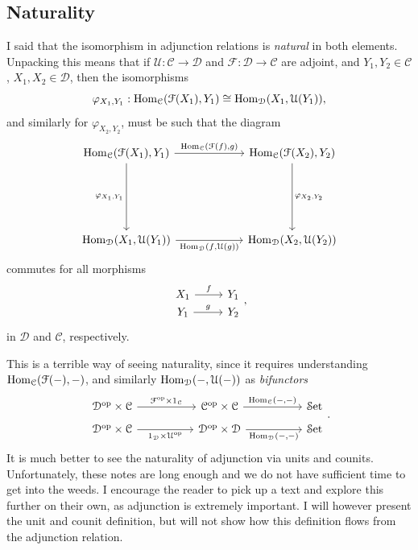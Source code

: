 \subsection{Naturality}

I said that the isomorphism in adjunction relations is \emph{natural} in both elements. Unpacking this means that if $\mathcal{U} : \mathcal{C}  \to \mathcal{D} $ and $\mathcal{F} : \mathcal{D}  \to \mathcal{C} $ are adjoint, and $Y_1,Y_2\in \mathcal{C} $, $X_1,X_2\in \mathcal{D} $, then the isomorphisms
\[
	\varphi_{X_1,Y_1} : \operatorname{Hom}_{\mathcal{C} }(\mathcal{F} (X_1), Y_1) \cong \operatorname{Hom}_{\mathcal{D} }(X_1, \mathcal{U} (Y_1)) 
,\]
and similarly  for $\varphi_{X_2,Y_2} $, must be such that the diagram
\[\begin{tikzcd}[row sep = 6em, column sep = 6em]
\Hom_{\mathcal{C} }(\mathcal{F} (X_1), Y_1) \ar[" \Hom_{\mathcal{C} }(\mathcal{F} (f)\text{,} g)  ", r] \ar[" \varphi_{X_1\text{,}Y_1}  "', d]  & \Hom_{\mathcal{C} }(\mathcal{F} (X_2), Y_2) \ar[" \varphi_{X_2\text{,}Y_2}  ", d]  \\
\Hom_{\mathcal{D} }(X_1, \mathcal{U} (Y_1)) \ar[" \Hom_{\mathcal{D} }(f\text{,} \mathcal{U} (g))  "', r]  & \Hom_{\mathcal{D} }(X_2, \mathcal{U} (Y_2)) 
\end{tikzcd}\]
commutes for all morphisms
\[\begin{tikzcd}[row sep = 0em, column sep = 2.5em]
X_1\ar[" f ", r]  & Y_1 \\
Y_1\ar[" g ", r]  & Y_2
\end{tikzcd},\]
in $\mathcal{D} $ and $\mathcal{C} $, respectively.

This is a terrible way of seeing naturality, since it requires understanding $\operatorname{Hom}_{\mathcal{C} }(\mathcal{F} (-), -) $, and similarly $\operatorname{Hom}_{\mathcal{D} }(-, \mathcal{U} (-)) $ as \emph{bifunctors} 
\[\begin{tikzcd}[row sep = 0.5em, column sep = 5em]
\mathcal{D} ^{\mathrm{op} } \times \mathcal{C} \ar[" \mathcal{F} ^{\mathrm{op} } \times 1_{\mathcal{C} }  ", r]  & \mathcal{C} ^{\mathrm{op} } \times \mathcal{C} \ar[" \Hom_{\mathcal{C} }(-\text{,} -)  ", r]  & \Set  \\
\mathcal{D} ^{\mathrm{op} } \times \mathcal{C} \ar[" 1_{\mathcal{D} } \times \mathcal{U} ^{\mathrm{op} }  "', r]   & \mathcal{D} ^{\mathrm{op} } \times \mathcal{D} \ar[" \Hom_{\mathcal{D} }(-\text{,} -)  "', r]  & \Set 
\end{tikzcd}.\]
It is much better to see the naturality of adjunction via units and counits. Unfortunately, these notes are long enough and we do not have sufficient time to get into the weeds. I encourage the reader to pick up a text and explore this further on their own, as adjunction is extremely important. I will however present the unit and counit definition, but will not show how this definition flows from the adjunction relation.

